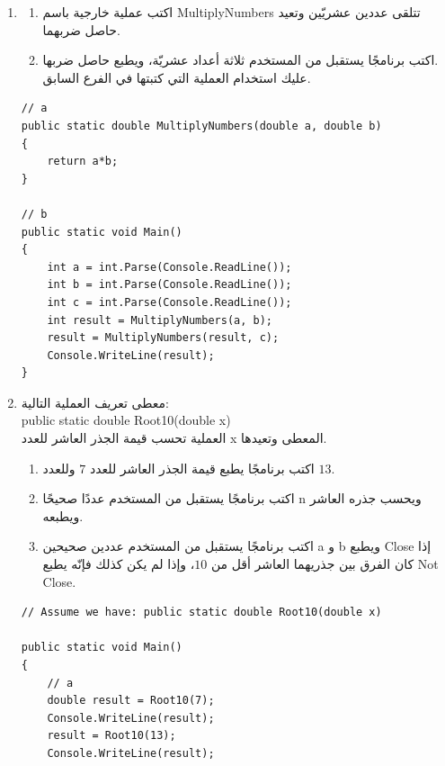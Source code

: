 ﻿\documentclass[14pt]{extarticle}
\begin{document}
\begin{enumerate}[itemsep=3em]
\begin{enumerate}
\clearpage
\item
\begin{enumerate}
    \item اكتب عملية خارجية باسم \textenglish{MultiplyNumbers} تتلقى عددين عشريّين وتعيد حاصل ضربهما.
    \item اكتب برنامجًا يستقبل من المستخدم ثلاثة أعداد عشريّة، ويطبع حاصل ضربها. \\
    عليك استخدام العملية التي كتبتها في الفرع السابق.
\end{enumerate}
\ifwithsols
\begin{boxSolution}
\begin{english}
\begin{verbatim}
// a
public static double MultiplyNumbers(double a, double b)
{
    return a*b;
}

// b
public static void Main()
{
    int a = int.Parse(Console.ReadLine());
    int b = int.Parse(Console.ReadLine());
    int c = int.Parse(Console.ReadLine());
    int result = MultiplyNumbers(a, b);
    result = MultiplyNumbers(result, c);
    Console.WriteLine(result);
}
\end{verbatim}
\end{english}
\end{boxSolution}
\clearpage
\fi

\item
معطى تعريف العملية التالية: \\
\textenglish{public static double Root10(double x)} \\
العملية تحسب قيمة الجذر العاشر للعدد \textenglish{x} المعطى وتعيدها.

\begin{enumerate}
\item اكتب برنامجًا يطبع قيمة الجذر العاشر للعدد $7$ وللعدد $13$.
\item اكتب برنامجًا يستقبل من المستخدم عددًا صحيحًا \textenglish{n} ويحسب جذره العاشر ويطبعه.
\item اكتب برنامجًا يستقبل من المستخدم عددين صحيحين \textenglish{a} و \textenglish{b} ويطبع \textenglish{Close} إذا كان الفرق بين جذريهما العاشر أقل من $10$، وإذا لم يكن كذلك فإنّه يطبع \textenglish{Not Close}.
\end{enumerate}

\ifwithsols
\begin{boxSolution}
\begin{english}
\begin{verbatim}
// Assume we have: public static double Root10(double x)

public static void Main()
{
    // a
    double result = Root10(7);
    Console.WriteLine(result);
    result = Root10(13);
    Console.WriteLine(result);


\end{verbatim}
\end{english}
\end{boxSolution}
\end{enumerate}
\end{enumerate}
\end{document}
